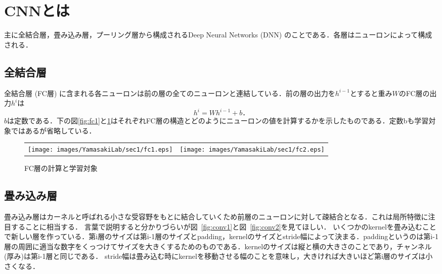 
\section{CNNとは}
主に全結合層，畳み込み層，プーリング層から構成されるDeep Neural Networks (DNN) のことである．各層はニューロンによって構成される．

\subsection{全結合層}
全結合層 (FC層) に含まれる各ニューロンは前の層の全てのニューロンと連結している．前の層の出力を\(h^{i-1}\)とすると重み\(W\)のFC層の出力\(h^i\)は
\[
h^i = Wh^{i-1} + b．
\]
\(b\)は定数である．下の図\ref{fig:fc1}と\ref{fig:fc2}はそれぞれFC層の構造とどのようにニューロンの値を計算するかを示したものである．定数bも学習対象ではあるが省略している．

\begin{figure}[ht]
    \begin{tabular}{cc}
      \begin{minipage}[t]{0.4\hsize}
        \centering
        \texttt{[image: images/YamasakiLab/sec1/fc1.eps]}
        \caption{FC層の構造}
        \label{fig:fc1}
      \end{minipage} &
      \begin{minipage}[t]{0.6\hsize}
        \centering
        \texttt{[image: images/YamasakiLab/sec1/fc2.eps]}
        \caption{FC層の計算と学習対象}
        \label{fig:fc2}
      \end{minipage}
    \end{tabular}
  \end{figure}


\subsection{畳み込み層}
畳み込み層はカーネルと呼ばれる小さな受容野をもとに結合していくため前層のニューロンに対して疎結合となる．これは局所特徴に注目することに相当する．
言葉で説明すると分かりづらいが図~\ref{fig:conv1}と図~\ref{fig:conv2}を見てほしい．
いくつかのkernelを畳み込むことで新しい層を作っている．第i層のサイズは第i-1層のサイズとpadding，kernelのサイズとstride幅によって決まる．paddingというのは第i-1層の周囲に適当な数字をくっつけてサイズを大きくするためのものである．kernelのサイズは縦と横の大きさのことであり，チャンネル(厚み)は第i-1層と同じである．
stride幅は畳み込む時にkernelを移動させる幅のことを意味し，大きければ大きいほど第i層のサイズは小さくなる．


